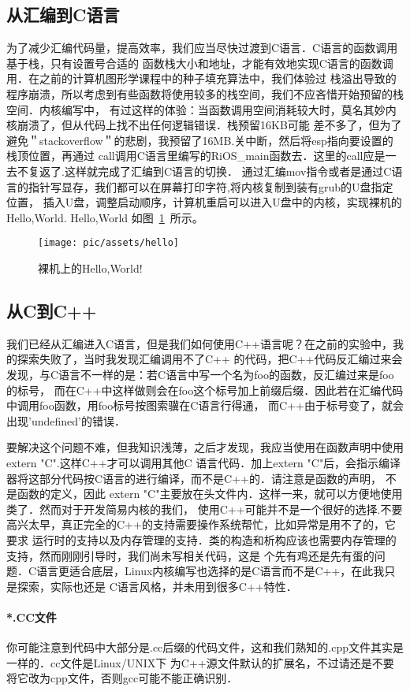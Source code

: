 \subsection{从汇编到C语言}
为了减少汇编代码量，提高效率，我们应当尽快过渡到C语言．C语言的函数调用基于栈，只有设置号合适的
函数栈大小和地址，才能有效地实现C语言的函数调用．在之前的计算机图形学课程中的种子填充算法中，我们体验过
栈溢出导致的程序崩溃，所以考虑到有些函数将使用较多的栈空间，我们不应吝惜开始预留的栈空间．内核编写中，
有过这样的体验：当函数调用空间消耗较大时，莫名其妙内核崩溃了，但从代码上找不出任何逻辑错误．栈预留16KB可能
差不多了，但为了避免＂stackoverflow＂的悲剧，我预留了16MB.关中断，然后将esp指向要设置的栈顶位置，再通过
call调用C语言里编写的RiOS\_main函数去．这里的call应是一去不复返了.这样就完成了汇编到C语言的切换．
通过汇编mov指令或者是通过C语言的指针写显存，我们都可以在屏幕打印字符,将内核复制到装有grub的U盘指定位置，
插入U盘，调整启动顺序，计算机重启可以进入U盘中的内核，实现裸机的Hello,World.
Hello,World 如图~\ref{hello}~所示。
\begin{figure}[!htbp]
	\centering	\texttt{[image: pic/assets/hello]}
    \caption{裸机上的Hello,World!}	\label{hello}	\end{figure}
\subsection{从C到C++}
我们已经从汇编进入C语言，但是我们如何使用C++语言呢？在之前的实验中，我的探索失败了，当时我发现汇编调用不了C++
的代码，把C++代码反汇编过来会发现，与C语言不一样的是：若C语言中写一个名为foo的函数，反汇编过来是foo的标号，
而在C++中这样做则会在foo这个标号加上前缀后缀．因此若在汇编代码中调用foo函数，用foo标号按图索骥在C语言行得通，
而C++由于标号变了，就会出现'undefined'的错误．

要解决这个问题不难，但我知识浅薄，之后才发现，我应当使用在函数声明中使用extern "C".这样C++才可以调用其他C
语言代码．加上extern "C"后，会指示编译器将这部分代码按C语言的进行编译，而不是C++的．请注意是函数的声明，
不是函数的定义，因此 extern "C"主要放在头文件内．这样一来，就可以方便地使用类了．然而对于开发简易内核的我们，
使用C++可能并不是一个很好的选择.不要高兴太早，真正完全的C++的支持需要操作系统帮忙，比如异常是用不了的，它要求
运行时的支持以及内存管理的支持．类的构造和析构应该也需要内存管理的支持，然而刚刚引导时，我们尚未写相关代码，这是
个先有鸡还是先有蛋的问题．C语言更适合底层，Linux内核编写也选择的是C语言而不是C++，在此我只是探索，实际也还是
C语言风格，并未用到很多C++特性．
\paragraph{*.CC文件} 你可能注意到代码中大部分是.cc后缀的代码文件，这和我们熟知的.cpp文件其实是一样的．cc文件是Linux/UNIX下
为C++源文件默认的扩展名，不过请还是不要将它改为cpp文件，否则gcc可能不能正确识别．
